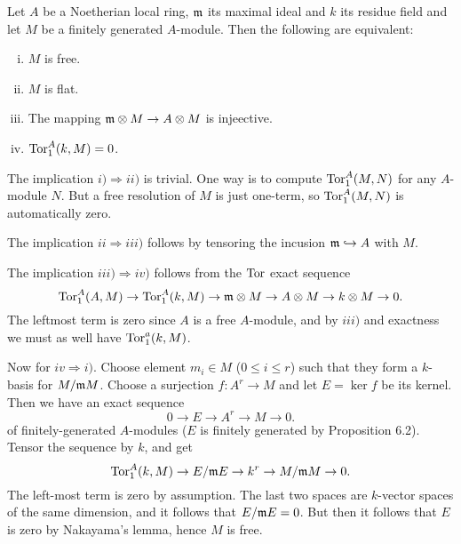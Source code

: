 \documentclass[11pt, english]{article}
\begin{document}
\begin{exc}[Exercise 15]
Let $A$ be a Noetherian local ring, $\mathfrak{m}$ its maximal ideal and $k$ its residue field and let $M$ be a finitely generated $A$-module. Then the following are equivalent:
\begin{enumerate}[i)]
\item $M$ is free.
\item $M$ is flat.
\item The mapping $\mathfrak{m} \otimes M \to A \otimes M$ is injeective.
\item $\operatorname{\mathrm{Tor}}_1^A(k,M)=0$.
\end{enumerate}
\end{exc}
\begin{sol}
The implication $i) \Rightarrow ii)$ is trivial. One way is to compute $\operatorname{\mathrm{Tor}}_1^A(M,N)$ for any $A$-module $N$. But a free resolution of $M$ is just one-term, so $\operatorname{\mathrm{Tor}}_1^A(M,N)$ is automatically zero.

The implication $ii \Rightarrow iii)$  follows by tensoring the incusion $\mathfrak{m} \hookrightarrow A$ with $M$. 

The implication $iii) \Rightarrow iv)$ follows from the $\operatorname{\mathrm{Tor}}$ exact sequence
\[
\operatorname{\mathrm{Tor}}_1^A(A,M) \to \operatorname{\mathrm{Tor}}^A_1(k,M) \to \mathfrak{m} \otimes M \to A \otimes M \to k \otimes M \to 0.
\]
The leftmost term is zero since $A$ is a free $A$-module, and by $iii)$ and exactness we must as well have $\operatorname{\mathrm{Tor}}_1^a(k,M)$.

Now for $iv \Rightarrow i)$. Choose element $m_i \in M$ ($0 \leq i \leq r$) such that they form a $k$-basis for $M/\mathfrak{m} M$. Choose a surjection $f:A^r \to M$ and let $E=\ker f$ be its kernel. Then we have an exact sequence
\[
0 \to E \to A^r \to M \to 0.
\]
of finitely-generated $A$-modules ($E$ is finitely generated by Proposition 6.2). Tensor the sequence by $k$, and get
\[
\operatorname{\mathrm{Tor}}_1^A(k,M) \to E/\mathfrak{m} E \to k^r \to M/\mathfrak{m} M \to 0.
\]
The left-most term is zero by assumption. The last two spaces are $k$-vector spaces of the same dimension, and it follows that $E/\mathfrak{m} E=0$. But then it follows that $E$ is zero by Nakayama's lemma, hence $M$ is free.
\end{sol}
\end{document}
